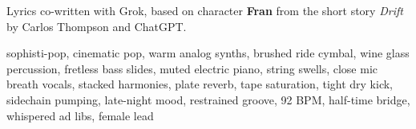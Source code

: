 

\begin{notes}
Lyrics co-written with Grok, based on character \textbf{Fran} from the short story \emph{Drift} by Carlos Thompson and ChatGPT.
\end{notes}

\begin{style}
sophisti-pop, cinematic pop, warm analog synths, brushed ride cymbal, wine glass percussion, fretless bass slides, muted electric piano, string swells, close mic breath vocals, stacked harmonies, plate reverb, tape saturation, tight dry kick, sidechain pumping, late-night mood, restrained groove, 92 BPM, half-time bridge, whispered ad libs, female lead
\end{style}

